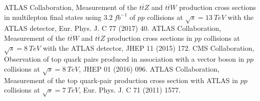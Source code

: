 \documentclass[11pt, twocolumn, a4paper]{article}
\begin{document}
\begin{thebibliography}{99}
 ATLAS Collaboration,
Measurement of the $t \overline{t} Z$ and $t \overline{t} W$ production cross sections in multilepton final states using $\SI{3.2}{fb^{-1}}$ of $pp$ collisions at $\sqrt{s} = \SI{13}{TeV}$ with the ATLAS detector, Eur. Phys. J. C 77 (2017) 40.
 ATLAS Collaboration, 
Measurement of the $t \overline{t} W$ and $t \overline{t} Z$ production cross sections in $pp$ collisions at $\sqrt{s} = \SI{8}{TeV}$ with the ATLAS detector, JHEP 11 (2015) 172.
 CMS Collaboration, 
Observation of top quark pairs produced in association with a vector boson in $pp$ collisions at $\sqrt{s} = \SI{8}{TeV}$, JHEP 01 (2016) 096.
 ATLAS Collaboration, 
Measurement of the top quark-pair production cross section with ATLAS in $pp$ collisions at $\sqrt{s} = \SI{7}{TeV}$,
Eur. Phys. J. C 71 (2011) 1577.
\end{thebibliography}
\end{document}
